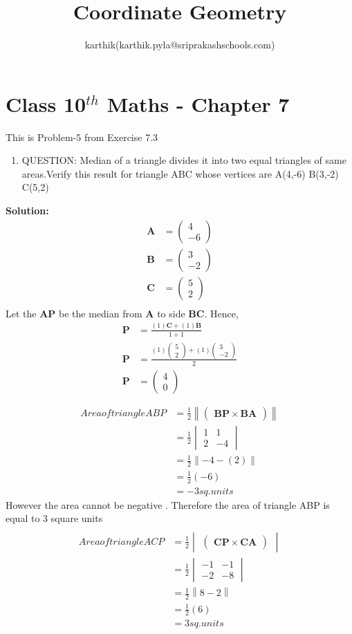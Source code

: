 \documentclass[10pt]{article}
\title{Coordinate Geometry}
\author{karthik(karthik.pyla@sriprakashschools.com)}
\newcommand{\myvec}[1]{\ensuremath{\begin{pmatrix}#1\end{pmatrix}}}
\newcommand{\mydet}[1]{\ensuremath{\begin{vmatrix}#1\end{vmatrix}}}
\newcommand{\solution}{\noindent \textbf{Solution: }}
\providecommand{\norm}[1]{\left\lVert#1\right\rVert}
\let\vec\mathbf
\begin{document}
\maketitle
\section*{Class 10$^{th}$ Maths - Chapter 7}
This is Problem-5 from Exercise 7.3
\begin{enumerate}
\item  QUESTION: Median of a triangle divides it into two equal triangles of same areas.Verify this result for triangle ABC whose vertices are A(4,-6) B(3,-2) C(5,2)
\end{enumerate}
\solution \\
\begin{align}
\vec{A} &= \myvec{4\\-6}\\
\vec{B} &= \myvec{3\\-2} \\
\vec{C} &= \myvec{5\\2}\\ 
\end{align}
Let the $\vec{AP}$ be the median from $\vec{A}$ to side $\vec{BC}$. Hence, 
\begin{align}
    \vec{P} &= \frac{(1)\vec{C}+(1)\vec{B}}{1+1}\\
    \vec{P} &= \frac{(1)\myvec{5\\2}+(1)\myvec{3\\-2}}{2}\\
    \vec{P} &= \myvec{4\\0}\\   
\end{align}
\begin{align}
\\Area of triangle ABP&=\frac{1}{2}\norm{ \myvec {\vec{BP}\times \vec{BA}}}\\&=\frac{1}{2}\mydet{ {1}&{1} \\{2}&{-4}}\\ &=\frac{1}{2}\norm{-4-(2)}\\&=\frac{1}{2}(-6)\\&=-3 sq.units
\end{align}
However the area cannot be negative . Therefore the area of triangle ABP is equal to 3 square units
\begin{align}
\\Area of triangle ACP&=\frac{1}{2}\mydet{ \myvec {\vec{CP}\times \vec{CA}}}\\&=\frac{1}{2}\mydet{ {-1}&{-1} \\{-2}&{-8}}\\ &=\frac{1}{2}\norm{8-2}\\&=\frac{1}{2}(6)\\&=3 sq.units
\end{align}
\end{document}
